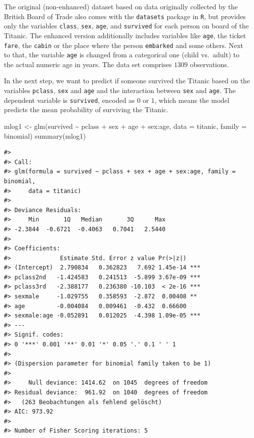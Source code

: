 \documentclass[
  11pt,
  a4paper,
  twoside]{scrbook}
\newenvironment{Shaded}{\begin{snugshade}}{\end{snugshade}}
\newcommand{\AttributeTok}[1]{\textcolor[rgb]{0.77,0.63,0.00}{#1}}
\newcommand{\FunctionTok}[1]{\textcolor[rgb]{0.00,0.00,0.00}{#1}}
\newcommand{\NormalTok}[1]{#1}
\newcommand{\OtherTok}[1]{\textcolor[rgb]{0.56,0.35,0.01}{#1}}
\newcommand{\SpecialCharTok}[1]{\textcolor[rgb]{0.00,0.00,0.00}{#1}}
\begin{document}
\linespread{1}

The original (non-enhanced) dataset based on data originally collected by the British Board of Trade also comes with the \texttt{datasets} package in \texttt{R}, but provides only the variables \texttt{class}, \texttt{sex}, \texttt{age}, and \texttt{survived} for each person on board of the Titanic. The enhanced version additionally includes variables like \texttt{age}, the ticket \texttt{fare}, the \texttt{cabin} or the place where the person \texttt{embarked} and some others. Next to that, the variable \texttt{age} is changed from a categorical one (child vs.~adult) to the actual numeric age in years. The data set comprises \(1309\) observations.

In the next step, we want to predict if someone survived the Titanic based on the variables \texttt{pclass}, \texttt{sex} and \texttt{age} and the interaction between \texttt{sex} and \texttt{age}. The dependent variable is \texttt{survived}, encoded as \(0\) or \(1\), which means the model predicts the mean probability of surviving the Titanic.

\linespread{1}

\begin{Shaded}
\begin{Highlighting}[]
\NormalTok{mlog1 }\OtherTok{\textless{}{-}} \FunctionTok{glm}\NormalTok{(survived }\SpecialCharTok{\textasciitilde{}}\NormalTok{ pclass }\SpecialCharTok{+}\NormalTok{ sex }\SpecialCharTok{+}\NormalTok{ age }\SpecialCharTok{+}\NormalTok{ sex}\SpecialCharTok{:}\NormalTok{age, }
             \AttributeTok{data =}\NormalTok{ titanic, }\AttributeTok{family =}\NormalTok{ binomial)}
\FunctionTok{summary}\NormalTok{(mlog1)}
\end{Highlighting}
\end{Shaded}

\linespread{1}

\begin{verbatim}
#> 
#> Call:
#> glm(formula = survived ~ pclass + sex + age + sex:age, family = binomial, 
#>     data = titanic)
#> 
#> Deviance Residuals: 
#>     Min       1Q   Median       3Q      Max  
#> -2.3844  -0.6721  -0.4063   0.7041   2.5440  
#> 
#> Coefficients:
#>              Estimate Std. Error z value Pr(>|z|)    
#> (Intercept)  2.790834   0.362823   7.692 1.45e-14 ***
#> pclass2nd   -1.424583   0.241513  -5.899 3.67e-09 ***
#> pclass3rd   -2.388177   0.236380 -10.103  < 2e-16 ***
#> sexmale     -1.029755   0.358593  -2.872  0.00408 ** 
#> age         -0.004084   0.009461  -0.432  0.66600    
#> sexmale:age -0.052891   0.012025  -4.398 1.09e-05 ***
#> ---
#> Signif. codes:  
#> 0 '***' 0.001 '**' 0.01 '*' 0.05 '.' 0.1 ' ' 1
#> 
#> (Dispersion parameter for binomial family taken to be 1)
#> 
#>     Null deviance: 1414.62  on 1045  degrees of freedom
#> Residual deviance:  961.92  on 1040  degrees of freedom
#>   (263 Beobachtungen als fehlend gelöscht)
#> AIC: 973.92
#> 
#> Number of Fisher Scoring iterations: 5
\end{verbatim}
\end{document}
